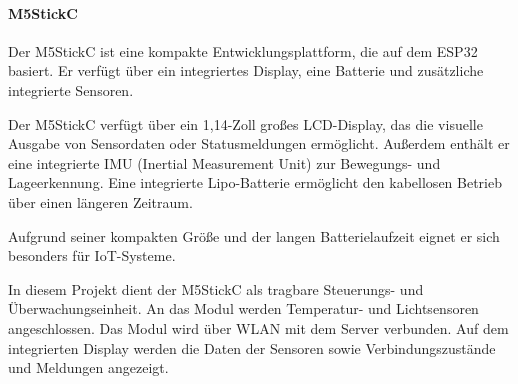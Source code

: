 \documentclass[12pt, letterpaper]{article}
\begin{document}
  \paragraph{M5StickC}
  \par \textbf{}
  \par Der M5StickC ist eine kompakte Entwicklungsplattform, die auf dem ESP32 basiert. Er verfügt über ein integriertes Display, eine Batterie und zusätzliche integrierte Sensoren.
  \par Der M5StickC verfügt über ein 1,14-Zoll großes LCD-Display, das die visuelle Ausgabe von Sensordaten oder Statusmeldungen ermöglicht. Außerdem enthält er eine integrierte IMU (Inertial Measurement Unit) zur Bewegungs- und Lageerkennung. Eine integrierte Lipo-Batterie ermöglicht den kabellosen Betrieb über einen längeren Zeitraum.
  \par Aufgrund seiner kompakten Größe und der langen Batterielaufzeit eignet er sich besonders für IoT-Systeme. 
  \par In diesem Projekt dient der M5StickC als tragbare Steuerungs- und Überwachungseinheit. An das Modul werden Temperatur- und Lichtsensoren angeschlossen. Das Modul wird über WLAN mit dem Server verbunden. Auf dem integrierten Display werden die Daten der Sensoren sowie Verbindungszustände und Meldungen angezeigt. 
\end{document}
